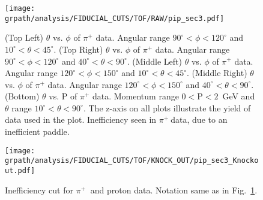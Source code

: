 \begin{figure}[h!]\begin{center}
\texttt{[image: \\grpath/analysis/FIDUCIAL\_CUTS/TOF/RAW/pip\_sec3.pdf]}
\caption[$\theta$ vs. $\phi$ of $\pi^+$ data]{\label{fig:pos:tofcut_off}(Top Left) $\theta$ vs. $\phi$ of $\pi^+$ data. Angular range $90^\circ < \phi < 120^\circ$ and $10^\circ < \theta < 45^\circ$. (Top Right) $\theta$ vs. $\phi$ of $\pi^+$ data. Angular range $90^\circ < \phi < 120^\circ$ and $40^\circ < \theta < 90^\circ$. (Middle Left) $\theta$ vs. $\phi$ of $\pi^+$ data. Angular range $120^\circ < \phi < 150^\circ$ and $10^\circ < \theta < 45^\circ$. (Middle Right) $\theta$ vs. $\phi$ of $\pi^+$ data. Angular range $120^\circ < \phi < 150^\circ$ and $40^\circ < \theta < 90^\circ$. (Bottom) $\theta$ vs. P of $\pi^+$ data. Momentum range $0 < \mathrm{P} < 2$~GeV and $\theta$ range $10^\circ < \theta < 90^\circ$. The z-axis on all plots illustrate the yield of data used in the plot.
Inefficiency seen in  $\pi^{+} \ $data, due to an inefficient  paddle.}
\end{center}\end{figure}
%
\begin{figure}[h!]\begin{center}
\texttt{[image: \\grpath/analysis/FIDUCIAL\_CUTS/TOF/KNOCK\_OUT/pip\_sec3\_Knockout.pdf]}
\caption[Inefficiency cut for $\pi^{+} \ $ and proton data]{\label{fig:pos:tofcut_on}Inefficiency cut for $\pi^{+} \ $ and proton data. Notation same as in Fig.~\ref{fig:pos:tofcut_off}.}
\end{center}\end{figure}

\FloatBarrier